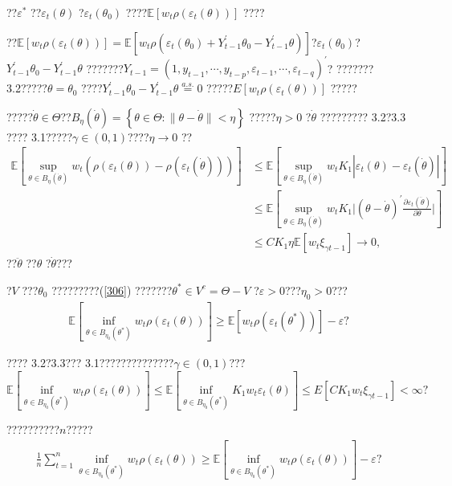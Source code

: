 \documentclass[a4paper,12pt,openany,oneside,utf-8]{ctexbook}
\begin{document}
	\noindent ??$\varepsilon^{*}$ ??$\varepsilon_t(\theta)$ ?$\varepsilon_t(\theta_0)$ ????$\mathbb{E}[w_t\rho(\varepsilon_t(\theta))]$ ????
	
	??$\mathbb{E}[w_t\rho(\varepsilon_t(\theta))]=\mathbb{E}[w_t\rho(\varepsilon_t(\theta_0)+Y_{t-1}^{\prime}\theta_0-Y_{t-1}^{\prime}\theta)]$?$\varepsilon_t(\theta_0)$?$Y_{t-1}^{\prime}\theta_0-Y_{t-1}^{\prime}\theta$ ???????$Y_{t-1}=(1,y_{t-1},\cdots,y_{t-p},\varepsilon_{t-1},\cdots,\varepsilon_{t-q})^{\prime}$? ??????? 3.2?????$\theta=\theta_0$ ????$Y_{t-1}^{\prime}\theta_0-Y_{t-1}^{\prime}\theta\overset{a.s.}{=}0$ ?????$E[w_t\rho(\varepsilon_t(\theta))]$ ?????
	
	?????$\dot{\theta}\in\Theta$??$B_{\eta}(\dot{\theta})=\left\{\theta\in\Theta:\|\theta-\dot{\theta}\|<\eta\right\}$ ?????$\eta>0$ ?$\dot{\theta}$ ????????? 3.2?3.3 ???? 3.1?????$\gamma\in(0,1)$????$\eta\to0$ ??
	\begin{align}\label{306}
		\mathbb{E}\left[\sup_{\theta\in B_{\eta}(\dot{\theta})}w_t(\rho(\varepsilon_t(\theta))-\rho(\varepsilon_t(\dot{\theta})))\right]
		&\le\mathbb{E}\left[\sup_{\theta\in B_{\eta}(\dot{\theta})}w_tK_1|\varepsilon_t(\theta)-\varepsilon_t(\dot{\theta})|\right]\nonumber\\
		&\le\mathbb{E}\left[\sup_{\theta\in B_{\eta}(\dot{\theta})}w_tK_1\Big|(\theta-\dot{\theta})^{\prime}\frac{\partial\varepsilon_t(\ddot{\theta})}{\partial\theta}\Big |\right]\nonumber\\
		&\le CK_1\eta\mathbb{E}\left[w_t\xi_{\gamma t-1}\right]\to0,
	\end{align}
	??$\ddot{\theta}$ ??$\theta$ ?$\dot{\theta}$???
	
	?$V$ ???$\theta_0$ ?????????(\ref{306}) ???????$\theta^{\ast}\in V^c=\Theta-V$ ?$\varepsilon>0$???$\eta_0>0$???
	\begin{align}\label{307}
		\mathbb{E}\left[\inf_{\theta\in B_{\eta_0}(\theta^{\ast})}w_t\rho(\varepsilon_t(\theta))\right]\ge\mathbb{E}[w_t\rho(\varepsilon_t(\theta^{\ast}))]-\varepsilon \mbox{?}
	\end{align}
	
	\noindent ???? 3.2?3.3??? 3.1??????????????$\gamma\in(0,1)$???
	$$\mathbb{E}\left[\inf_{\theta\in B_{\eta_0}(\theta^{\ast})}w_t\rho(\varepsilon_t(\theta))\right]\le\mathbb{E}\left[\inf_{\theta\in B_{\eta_0}(\theta^{\ast})}K_1w_t\varepsilon_t(\theta)\right]\le E[CK_1w_t\xi_{\gamma t-1}]<\infty\mbox{?}$$
	
	\noindent ??????????$n$?????
	\begin{align}\label{308}
		\frac{1}{n}\sum_{t=1}^n\inf_{\theta\in B_{\eta_0}(\theta^{\ast})}w_t\rho(\varepsilon_t(\theta))\ge\mathbb{E}\left[\inf_{\theta\in B_{\eta_0}(\theta^{\ast})}w_t\rho(\varepsilon_t(\theta))\right]-\varepsilon\mbox{?}
	\end{align}
	
\end{document}
